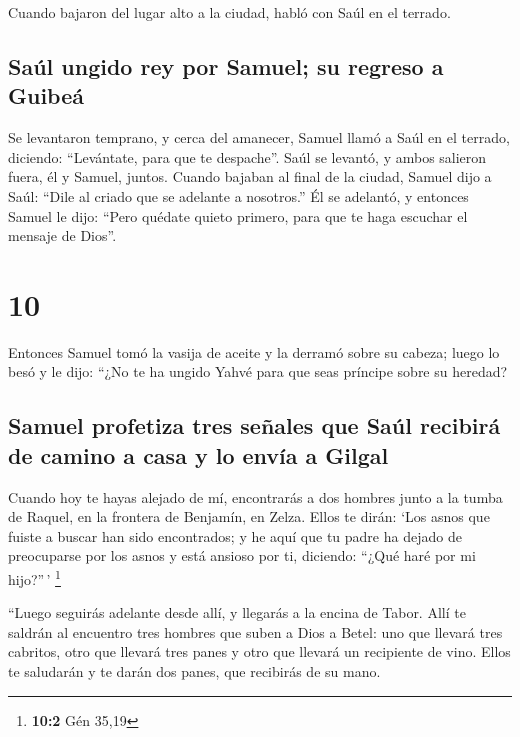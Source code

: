  Cuando bajaron del lugar alto a la ciudad, habló con
Saúl en el terrado.

\hypertarget{sauxfal-ungido-rey-por-samuel-su-regreso-a-guibeuxe1}{%
\subsection{Saúl ungido rey por Samuel; su regreso a
Guibeá}\label{sauxfal-ungido-rey-por-samuel-su-regreso-a-guibeuxe1}}

 Se levantaron temprano, y cerca del amanecer, Samuel
llamó a Saúl en el terrado, diciendo: ``Levántate, para que te
despache''. Saúl se levantó, y ambos salieron fuera, él y Samuel,
juntos.  Cuando bajaban al final de la ciudad, Samuel
dijo a Saúl: ``Dile al criado que se adelante a nosotros.'' Él se
adelantó, y entonces Samuel le dijo: ``Pero quédate quieto primero, para
que te haga escuchar el mensaje de Dios''.

\hypertarget{section-9}{%
\section{10}\label{section-9}}

 Entonces Samuel tomó la vasija de aceite y la derramó
sobre su cabeza; luego lo besó y le dijo: ``¿No te ha ungido Yahvé para
que seas príncipe sobre su heredad?

\hypertarget{samuel-profetiza-tres-seuxf1ales-que-sauxfal-recibiruxe1-de-camino-a-casa-y-lo-envuxeda-a-gilgal}{%
\subsection{Samuel profetiza tres señales que Saúl recibirá de camino a
casa y lo envía a
Gilgal}\label{samuel-profetiza-tres-seuxf1ales-que-sauxfal-recibiruxe1-de-camino-a-casa-y-lo-envuxeda-a-gilgal}}

 Cuando hoy te hayas alejado de mí, encontrarás a dos
hombres junto a la tumba de Raquel, en la frontera de Benjamín, en
Zelza. Ellos te dirán: `Los asnos que fuiste a buscar han sido
encontrados; y he aquí que tu padre ha dejado de preocuparse por los
asnos y está ansioso por ti, diciendo: ``¿Qué haré por mi hijo?''\,'
\footnote{\textbf{10:2} Gén 35,19}

 ``Luego seguirás adelante desde allí, y llegarás a la
encina de Tabor. Allí te saldrán al encuentro tres hombres que suben a
Dios a Betel: uno que llevará tres cabritos, otro que llevará tres panes
y otro que llevará un recipiente de vino.  Ellos te
saludarán y te darán dos panes, que recibirás de su mano.

